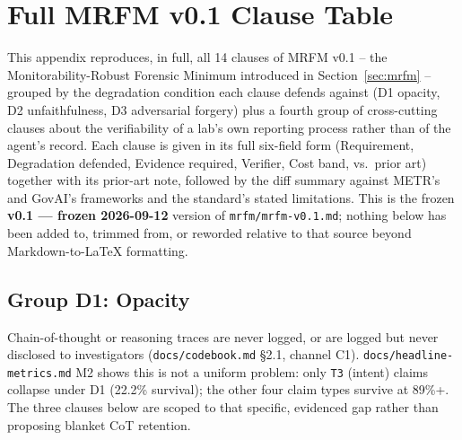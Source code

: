 %
%

\section{Full MRFM v0.1 Clause Table}
\label{app:mrfm-table}

This appendix reproduces, in full, all 14 clauses of MRFM v0.1 -- the
Monitorability-Robust Forensic Minimum introduced in
Section~\ref{sec:mrfm} -- grouped by the degradation condition each clause
defends against (D1 opacity, D2 unfaithfulness, D3 adversarial forgery) plus
a fourth group of cross-cutting clauses about the verifiability of a lab's
own reporting process rather than of the agent's record. Each clause is
given in its full six-field form (Requirement, Degradation defended,
Evidence required, Verifier, Cost band, vs.\ prior art) together with its
prior-art note, followed by the diff summary against METR's and GovAI's
frameworks and the standard's stated limitations. This is the frozen
\textbf{v0.1 --- frozen 2026-09-12} version of \texttt{mrfm/mrfm-v0.1.md};
nothing below has been added to, trimmed from, or reworded relative to that
source beyond Markdown-to-\LaTeX{} formatting.

\subsection*{Group D1: Opacity}
Chain-of-thought or reasoning traces are never logged, or are logged but never disclosed to investigators (\texttt{docs/codebook.md} \S{}2.1, channel C1). \texttt{docs/headline-metrics.md} M2 shows this is not a uniform problem: only \texttt{T3} (intent) claims collapse under D1 (22.2\% survival); the other four claim types survive at 89\%+. The three clauses below are scoped to that specific, evidenced gap rather than proposing blanket CoT retention.

